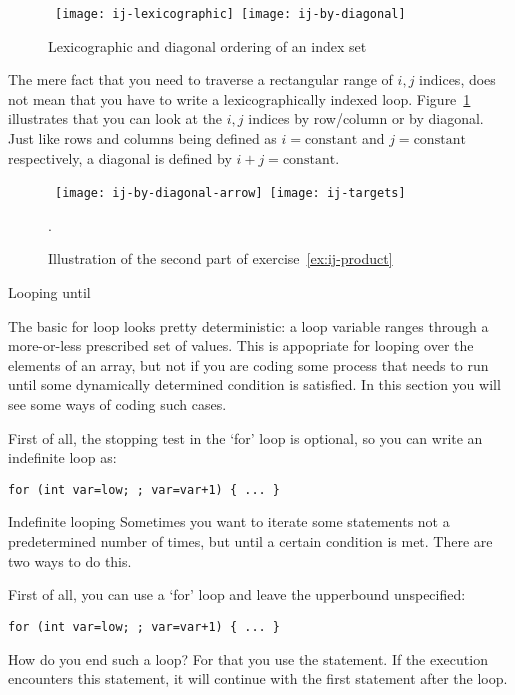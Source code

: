 \begin{figure}[ht]
  \hbox{%
    \texttt{[image: ij-lexicographic]}
    \texttt{[image: ij-by-diagonal]}
    }
  \caption{Lexicographic and diagonal ordering of an index set}  
  \label{fig:ij-lex}
\end{figure}

The mere fact that you need to traverse a rectangular range
of $i,j$ indices,
does not mean that you have to write a lexicographically
indexed loop.
Figure~\ref{fig:ij-lex} illustrates that you can look at the $i,j$
indices by row/column or by diagonal. Just like rows and columns being
defined as $i=\mathrm{constant}$ and $j=\mathrm{constant}$
respectively,
a diagonal is defined by $i+j=\mathrm{constant}$.

\begin{figure}[ht]
  \hbox{%
    \texttt{[image: ij-by-diagonal-arrow]}
    \texttt{[image: ij-targets]}
    }
  \caption{Illustration of the second part of exercise~\ref{ex:ij-product}}.
  \label{fig:ij-min}
\end{figure}

 {Looping until}
\label{sec:loopuntil}

The basic for loop looks pretty deterministic: a loop variable ranges
through a more-or-less prescribed set of values. This is appopriate
for looping over the elements of an array, but not if you are coding
some process that needs to run until some dynamically determined
condition is satisfied. In this section you will see some ways of
coding such cases.

First of all, the stopping test in the `for' loop is optional, so you
can write an indefinite loop as:
\begin{lstlisting}
for (int var=low; ; var=var+1) { ... }
\end{lstlisting}

\begin{slide}{Indefinite looping}
  \label{sl:for-inf}
  Sometimes you want to iterate some statements not a predetermined
  number of times, but until a certain condition is met. There are two
  ways to do this.

  First of all, you can use a `for' loop and leave the upperbound
  unspecified:
\begin{lstlisting}
for (int var=low; ; var=var+1) { ... }
\end{lstlisting}
\end{slide}

How do you end such a loop? For that you use the
 statement. If the execution encounters this
statement, it will continue with the first statement after the loop.

